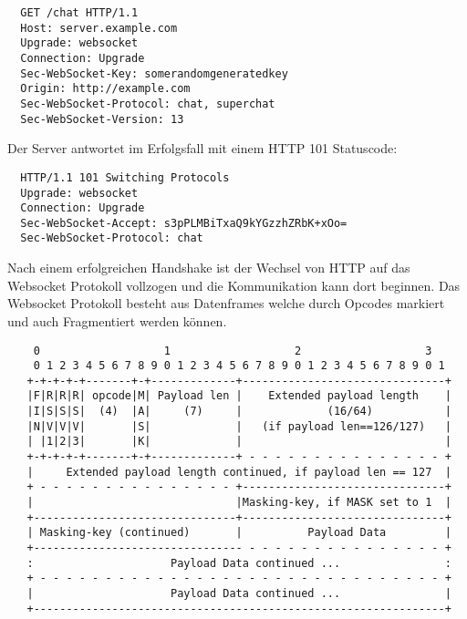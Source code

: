 \begin{verbatim}
  GET /chat HTTP/1.1
  Host: server.example.com
  Upgrade: websocket
  Connection: Upgrade
  Sec-WebSocket-Key: somerandomgeneratedkey
  Origin: http://example.com
  Sec-WebSocket-Protocol: chat, superchat
  Sec-WebSocket-Version: 13
\end{verbatim}
Der Server antwortet im Erfolgsfall mit einem HTTP 101 Statuscode:
\begin{verbatim}
  HTTP/1.1 101 Switching Protocols
  Upgrade: websocket
  Connection: Upgrade
  Sec-WebSocket-Accept: s3pPLMBiTxaQ9kYGzzhZRbK+xOo=
  Sec-WebSocket-Protocol: chat
\end{verbatim}
Nach einem erfolgreichen Handshake ist der Wechsel von HTTP auf das Websocket Protokoll vollzogen und die Kommunikation kann dort beginnen. Das Websocket Protokoll besteht aus Datenframes welche durch Opcodes markiert und auch Fragmentiert werden können.
\begin{verbatim}
    0                   1                   2                   3
    0 1 2 3 4 5 6 7 8 9 0 1 2 3 4 5 6 7 8 9 0 1 2 3 4 5 6 7 8 9 0 1
   +-+-+-+-+-------+-+-------------+-------------------------------+
   |F|R|R|R| opcode|M| Payload len |    Extended payload length    |
   |I|S|S|S|  (4)  |A|     (7)     |             (16/64)           |
   |N|V|V|V|       |S|             |   (if payload len==126/127)   |
   | |1|2|3|       |K|             |                               |
   +-+-+-+-+-------+-+-------------+ - - - - - - - - - - - - - - - +
   |     Extended payload length continued, if payload len == 127  |
   + - - - - - - - - - - - - - - - +-------------------------------+
   |                               |Masking-key, if MASK set to 1  |
   +-------------------------------+-------------------------------+
   | Masking-key (continued)       |          Payload Data         |
   +-------------------------------- - - - - - - - - - - - - - - - +
   :                     Payload Data continued ...                :
   + - - - - - - - - - - - - - - - - - - - - - - - - - - - - - - - +
   |                     Payload Data continued ...                |
   +---------------------------------------------------------------+
\end{verbatim}
